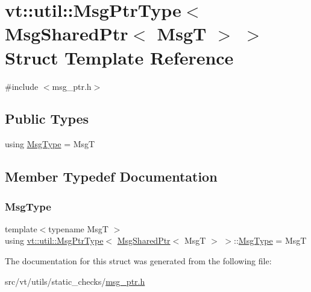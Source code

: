 \hypertarget{structvt_1_1util_1_1_msg_ptr_type_3_01_msg_shared_ptr_3_01_msg_t_01_4_01_4}{}\section{vt\+:\+:util\+:\+:Msg\+Ptr\+Type$<$ Msg\+Shared\+Ptr$<$ MsgT $>$ $>$ Struct Template Reference}
\label{structvt_1_1util_1_1_msg_ptr_type_3_01_msg_shared_ptr_3_01_msg_t_01_4_01_4}


{\ttfamily \#include $<$msg\+\_\+ptr.\+h$>$}

\subsection*{Public Types}
\begin{DoxyCompactItemize}
\item 
using \hyperlink{structvt_1_1util_1_1_msg_ptr_type_3_01_msg_shared_ptr_3_01_msg_t_01_4_01_4_a5bf797cea95b53d1c48dbfe168593970}{Msg\+Type} = MsgT
\end{DoxyCompactItemize}


\subsection{Member Typedef Documentation}
\mbox{\label{structvt_1_1util_1_1_msg_ptr_type_3_01_msg_shared_ptr_3_01_msg_t_01_4_01_4_a5bf797cea95b53d1c48dbfe168593970}} 
\subsubsection{\texorpdfstring{Msg\+Type}{MsgType}}
{\footnotesize\ttfamily template$<$typename MsgT $>$ \\
using \hyperlink{structvt_1_1util_1_1_msg_ptr_type}{vt\+::util\+::\+Msg\+Ptr\+Type}$<$ \hyperlink{namespacevt_ab2b3d506ec8e8d1540aede826d84a239}{Msg\+Shared\+Ptr}$<$ MsgT $>$ $>$\+::\hyperlink{structvt_1_1util_1_1_msg_ptr_type_3_01_msg_shared_ptr_3_01_msg_t_01_4_01_4_a5bf797cea95b53d1c48dbfe168593970}{Msg\+Type} =  MsgT}



The documentation for this struct was generated from the following file\+:\begin{DoxyCompactItemize}
\item 
src/vt/utils/static\+\_\+checks/\hyperlink{msg__ptr_8h}{msg\+\_\+ptr.\+h}\end{DoxyCompactItemize}
